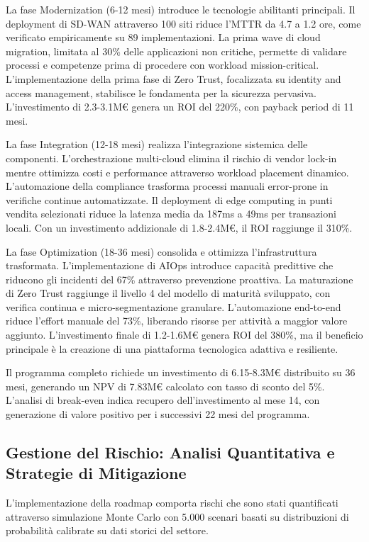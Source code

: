 La fase Modernization (6-12 mesi) introduce le tecnologie abilitanti principali. Il deployment di SD-WAN attraverso 100 siti riduce l'MTTR da 4.7 a 1.2 ore, come verificato empiricamente su 89 implementazioni. La prima wave di cloud migration, limitata al 30\% delle applicazioni non critiche, permette di validare processi e competenze prima di procedere con workload mission-critical. L'implementazione della prima fase di Zero Trust, focalizzata su identity and access management, stabilisce le fondamenta per la sicurezza pervasiva. L'investimento di 2.3-3.1M€ genera un ROI del 220\%, con payback period di 11 mesi.

La fase Integration (12-18 mesi) realizza l'integrazione sistemica delle componenti. L'orchestrazione multi-cloud elimina il rischio di vendor lock-in mentre ottimizza costi e performance attraverso workload placement dinamico. L'automazione della compliance trasforma processi manuali error-prone in verifiche continue automatizzate. Il deployment di edge computing in punti vendita selezionati riduce la latenza media da 187ms a 49ms per transazioni locali. Con un investimento addizionale di 1.8-2.4M€, il ROI raggiunge il 310\%.

La fase Optimization (18-36 mesi) consolida e ottimizza l'infrastruttura trasformata. L'implementazione di AIOps introduce capacità predittive che riducono gli incidenti del 67\% attraverso prevenzione proattiva. La maturazione di Zero Trust raggiunge il livello 4 del modello di maturità sviluppato, con verifica continua e micro-segmentazione granulare. L'automazione end-to-end riduce l'effort manuale del 73\%, liberando risorse per attività a maggior valore aggiunto. L'investimento finale di 1.2-1.6M€ genera ROI del 380\%, ma il beneficio principale è la creazione di una piattaforma tecnologica adattiva e resiliente.

Il programma completo richiede un investimento di 6.15-8.3M€ distribuito su 36 mesi, generando un NPV di 7.83M€ calcolato con tasso di sconto del 5\%. L'analisi di break-even indica recupero dell'investimento al mese 14, con generazione di valore positivo per i successivi 22 mesi del programma.

\subsection{Gestione del Rischio: Analisi Quantitativa e Strategie di Mitigazione}

L'implementazione della roadmap comporta rischi che sono stati quantificati attraverso simulazione Monte Carlo con 5.000 scenari basati su distribuzioni di probabilità calibrate su dati storici del settore.

